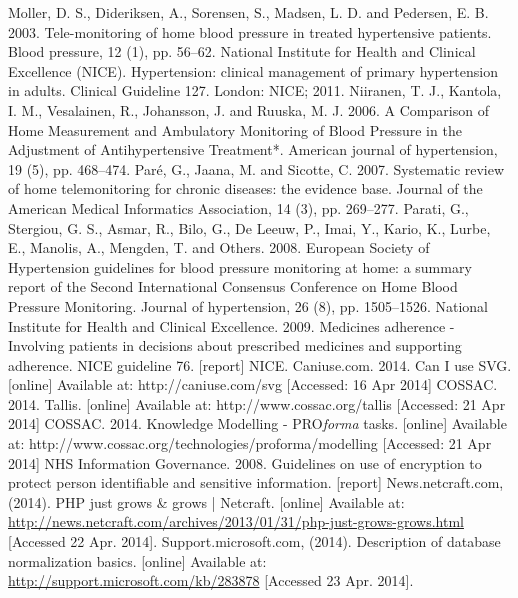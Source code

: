 \documentclass[11pt]{article}
\begin{document}
\begin{thebibliography}{40}
\begin{singlespace}
Moller, D. S., Dideriksen, A., Sorensen, S., Madsen, L. D. and Pedersen, E. B. 2003. Tele-monitoring of home blood pressure in treated hypertensive patients. Blood pressure, 12 (1), pp. 56--62.
National Institute for Health and Clinical Excellence (NICE). Hypertension: clinical management of primary hypertension in adults. Clinical Guideline 127. London: NICE; 2011.
Niiranen, T. J., Kantola, I. M., Vesalainen, R., Johansson, J. and Ruuska, M. J. 2006. A Comparison of Home Measurement and Ambulatory Monitoring of Blood Pressure in the Adjustment of Antihypertensive Treatment*. American journal of hypertension, 19 (5), pp. 468--474.
Par\'e, G., Jaana, M. and Sicotte, C. 2007. Systematic review of home telemonitoring for chronic diseases: the evidence base. Journal of the American Medical Informatics Association, 14 (3), pp. 269--277.
Parati, G., Stergiou, G. S., Asmar, R., Bilo, G., De Leeuw, P., Imai, Y., Kario, K., Lurbe, E., Manolis, A., Mengden, T. and Others. 2008. European Society of Hypertension guidelines for blood pressure monitoring at home: a summary report of the Second International Consensus Conference on Home Blood Pressure Monitoring. Journal of hypertension, 26 (8), pp. 1505--1526.
National Institute for Health and Clinical Excellence. 2009. Medicines adherence - Involving patients in decisions about prescribed medicines and supporting adherence. NICE guideline 76. [report] NICE.
Caniuse.com. 2014. Can I use SVG. [online] Available at: http://caniuse.com/svg [Accessed: 16 Apr 2014]
COSSAC. 2014. Tallis. [online] Available at: http://www.cossac.org/tallis [Accessed: 21 Apr 2014]
COSSAC. 2014. Knowledge Modelling - PRO\textit{forma} tasks. [online] Available at: http://www.cossac.org/technologies/proforma/modelling [Accessed: 21 Apr 2014]
NHS Information Governance. 2008. Guidelines on use of encryption to protect person identifiable and sensitive information. [report]
News.netcraft.com, (2014). PHP just grows \& grows | Netcraft. [online] Available at: \url{http://news.netcraft.com/archives/2013/01/31/php-just-grows-grows.html} [Accessed 22 Apr. 2014].
Support.microsoft.com, (2014). Description of database normalization basics. [online] Available at: \url{http://support.microsoft.com/kb/283878} [Accessed 23 Apr. 2014].

\end{singlespace}
\end{thebibliography}
\end{document}
